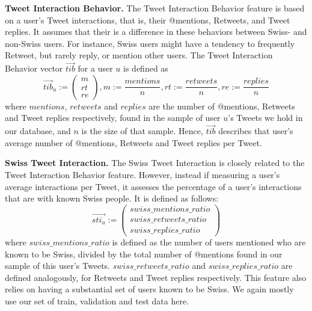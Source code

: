 \documentclass[10pt,a4paper]{article}
\begin{document}
\textbf{Tweet Interaction Behavior.} The Tweet Interaction Behavior feature is based on a user's Tweet interactions, that is, their @mentions, Retweets, and Tweet replies. It assumes that their is a difference in these behaviors between Swiss- and non-Swiss users. For instance, Swiss users might have a tendency to frequently Retweet, but rarely reply, or mention other users. The Tweet Interaction Behavior vector $\overrightarrow{tib}$ for a user $u$ is defined as
\begin{equation}
\overrightarrow{tib}_u := 
\begin{pmatrix}
m \\ rt \\ re
\end{pmatrix}, m := \frac{mentions}{n}, rt := \frac{retweets}{n}, re := \frac{replies}{n}
\end{equation}
where $mentions$, $retweets$ and $replies$ are the number of @mentions, Retweets and Tweet replies respectively, found in the sample of user $u$'s Tweets we hold in our database, and $n$ is the size of that sample. Hence, $\overrightarrow{tib}$ describes that user's average number of @mentions, Retweets and Tweet replies per Tweet.

\textbf{Swiss Tweet Interaction.} The Swiss Tweet Interaction is closely related to the Tweet Interaction Behavior feature. However, instead if measuring a user's average interactions per Tweet, it assesses the percentage of a user's interactions that are with known Swiss people. It is defined as follows:
\begin{equation}
\overrightarrow{sti_u} := 
\begin{pmatrix}
swiss\_mentions\_ratio \\ swiss\_retweets\_ratio \\ swiss\_replies\_ratio
\end{pmatrix}
\end{equation}
where $swiss\_mentions\_ratio$ is defined as the number of users mentioned who are known to be Swiss, divided by the total number of @mentions found in our sample of this user's Tweets. $swiss\_retweets\_ratio$ and $swiss\_replies\_ratio$ are defined analogously, for Retweets and Tweet replies respectively. This feature also relies on having a substantial set of users known to be Swiss. We again mostly use our set of train, validation and test data here. 
\end{document}
